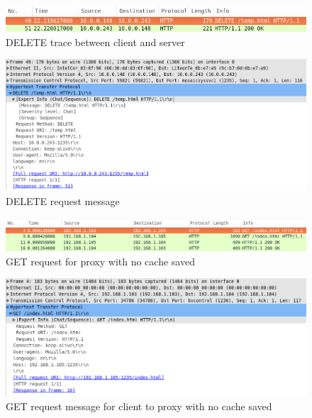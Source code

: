 \documentclass[10pt,twocolumn]{witseiepaper}
\begin{document}
		\begin{figure}[h!]
			\centering
			\includegraphics[width=\columnwidth]{resources/delete_request}
			\caption{DELETE trace between client and server}
			\label{fig:basic_delete}
		\end{figure}
		
		\begin{figure}[h!]
			\centering
			\includegraphics[width=\columnwidth]{resources/delete_request_message}
			\caption{DELETE request message}
			\label{fig:basic_delete_message}
		\end{figure}
		
		\begin{figure}[h!]
			\centering
			\includegraphics[width=\columnwidth]{resources/proxy_new}
			\caption{GET request for proxy with no cache saved}
			\label{fig:proxy_new}
		\end{figure}
		
		\begin{figure}[h!]
			\centering
			\includegraphics[width=\columnwidth]{resources/proxy_new_client}
			\caption{GET request message for client to proxy with no cache saved}
			\label{fig:proxy_new_client}
		\end{figure}
		
\end{document}
